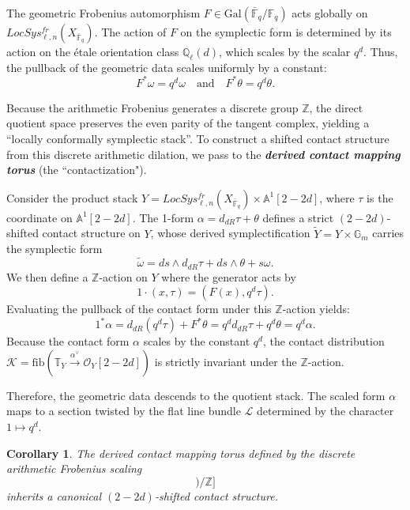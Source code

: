 \documentclass[reqno]{amsart}
\newtheorem{corollary}[theorem]{Corollary}
\theoremstyle{definition}
\theoremstyle{remark}
\newcommand{\TT}{\mathbb{T}}
\newcommand{\Gm}{\mathbb{G}_m}
\newcommand{\cO}{\mathcal{O}}
\newcommand{\cL}{\mathcal{L}}
\newcommand{\cK}{\mathcal{K}}
\newcommand{\bfem}[1]{\textbf{\textit{#1}}}
\begin{document}
{The geometric Frobenius automorphism $F \in \mathrm{Gal}(\bar{\mathbb{F}}_q/\mathbb{F}_q)$ acts globally on $LocSys_{\ell,n}^{fr}(X_{\bar{\mathbb{F}}_q})$. The action of $F$ on the symplectic form is determined by its action on the \'{e}tale orientation class $\mathbb{Q}_\ell(d)$, which scales by the scalar $q^d$. Thus, the pullback of the geometric data scales uniformly by a constant:
\begin{equation*}
    F^* \omega = q^d \omega \quad \text{and} \quad F^*\theta = q^d \theta.
\end{equation*}

Because the arithmetic Frobenius generates a discrete group $\mathbb{Z}$, the direct quotient space preserves the even parity of the tangent complex, yielding a ``locally conformally symplectic stack''. To construct a shifted contact structure from this discrete arithmetic dilation, we pass to the \bfem{derived contact mapping torus} (the ``contactization").

Consider the product stack $Y = LocSys_{\ell,n}^{fr}(X_{\bar{\mathbb{F}}_q}) \times \mathbb{A}^1[2-2d]$, where $\tau$ is the coordinate on $\mathbb{A}^1[2-2d]$. The 1-form $\alpha = d_{dR}\tau + \theta$ defines a strict $(2-2d)$-shifted contact structure on $Y$, whose derived symplectification $\widetilde{Y} = Y \times \Gm$ carries the symplectic form $$\widetilde{\omega} = ds \wedge d_{dR}\tau + ds \wedge \theta + s \omega.$$
We then define a $\mathbb{Z}$-action on $Y$ where the generator acts by 
\begin{equation*}
    1 \cdot (x, \tau) = (F(x), q^d \tau).
\end{equation*}
Evaluating the pullback of the contact form under this $\mathbb{Z}$-action yields:
\begin{equation*}
    1^* \alpha = d_{dR}(q^d \tau) + F^*\theta = q^d d_{dR}\tau + q^d \theta = q^d \alpha.
\end{equation*}
Because the contact form $\alpha$ scales by the constant $q^d$, the contact distribution $\cK = \mathrm{fib}(\TT_Y \xrightarrow{\alpha^\vee} \cO_Y[2-2d])$ is strictly invariant under the $\mathbb{Z}$-action. 

Therefore, the geometric data descends to the quotient stack. The scaled form $\alpha$ maps to a section twisted by the flat line bundle $\cL$ determined by the character $1 \mapsto q^d$.

\begin{corollary} \label{cor: l-adic local sys}
    The derived contact mapping torus defined by the discrete arithmetic Frobenius scaling
    \begin{equation*}
        [(LocSys_{\ell,n}^{fr}(X_{\bar{\mathbb{F}}_q}) \times \mathbb{A}^1[2-2d]) / \mathbb{Z}]
    \end{equation*}
    inherits a canonical $(2-2d)$-shifted contact structure.
\end{corollary}

}
\end{document}
